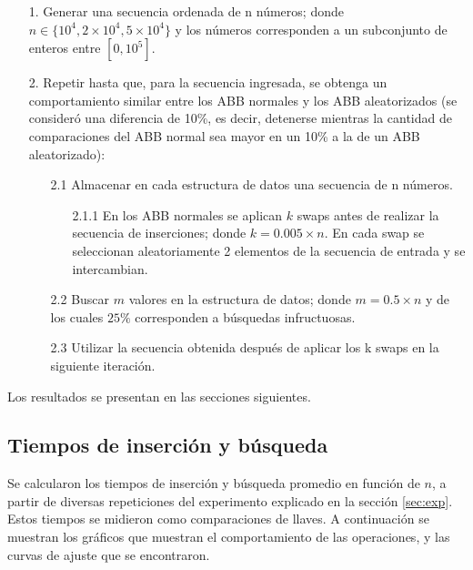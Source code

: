 \documentclass[12pt,letterpaper]{article}
\begin{document}
\begin{itemize}
\item[1.] Generar una secuencia ordenada de n números; donde $n \in \{10^{4}, 2 \times 10^{4} , 5 \times 10^{4}\}$ y los números corresponden a un subconjunto de enteros entre $[0, 10^{5}]$.
\item[2.] Repetir hasta que, para la secuencia ingresada, se obtenga un comportamiento similar entre los ABB normales y los ABB aleatorizados (se consideró una diferencia de 10\%, es decir, detenerse mientras la cantidad de comparaciones del ABB normal sea mayor en un 10\% a la de un ABB aleatorizado):
	\begin{itemize}
	\item[2.1] Almacenar en cada estructura de datos una secuencia de n números.
		\begin{itemize}
		\item[2.1.1] En los ABB normales se aplican $k$ swaps antes de realizar la secuencia de inserciones; donde $k = 0.005 \times n$. En cada swap se seleccionan aleatoriamente 2 elementos de la secuencia de entrada y se intercambian.
		\end{itemize}
	\item[2.2] Buscar $m$ valores en la estructura de datos; donde $m = 0.5 \times n$ y de los cuales $25\%$ corresponden a búsquedas infructuosas.
	\item[2.3] Utilizar la secuencia obtenida después de aplicar los k swaps en la siguiente iteración.
	\end{itemize}
\end{itemize}

Los resultados se presentan en las secciones siguientes.

\newpage
\subsection{Tiempos de inserción y búsqueda}
Se calcularon los tiempos de inserción y búsqueda promedio en función de $n$, a partir de diversas repeticiones del experimento explicado en la sección \ref{sec:exp}. Estos tiempos se midieron como comparaciones de llaves. A continuación se muestran los gráficos que muestran el comportamiento de las operaciones, y las curvas de ajuste que se encontraron.\\
\end{document}

